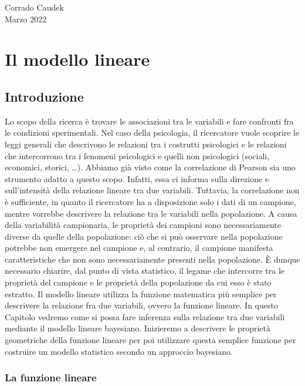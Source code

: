 \documentclass[
  11pt,
]{krantz}
\theoremstyle{definition}
\theoremstyle{definition}
\theoremstyle{definition}
\theoremstyle{definition}
\theoremstyle{remark}
\begin{document}
\begin{flushright}
Corrado Caudek\\
Marzo 2022 \end{flushright}

\mainmatter

\hypertarget{part-il-modello-lineare}{%
\part{Il modello lineare}\label{part-il-modello-lineare}}

\hypertarget{regr-models-intro}{%
\chapter{Introduzione}\label{regr-models-intro}}

Lo scopo della ricerca è trovare le associazioni tra le variabili e fare confronti fra le condizioni sperimentali. Nel caso della psicologia, il ricercatore vuole scoprire le leggi generali che descrivono le relazioni tra i costrutti psicologici e le relazioni che intercorrono tra i fenomeni psicologici e quelli non psicologici (sociali, economici, storici, \ldots). Abbiamo già visto come la correlazione di Pearson sia uno strumento adatto a questo scopo. Infatti, essa ci informa sulla direzione e sull'intensità della relazione lineare tra due variabili. Tuttavia, la correlazione non è sufficiente, in quanto il ricercatore ha a disposizione solo i dati di un campione, mentre vorrebbe descrivere la relazione tra le variabili nella popolazione. A causa della variabilità campionaria, le proprietà dei campioni sono necessariamente diverse da quelle della popolazione: ciò che si può osservare nella popolazione potrebbe non emergere nel campione e, al contrario, il campione manifesta caratteristiche che non sono necessariamente presenti nella popolazione. È dunque necessario chiarire, dal punto di vista statistico, il legame che intercorre tra le proprietà del campione e le proprietà della popolazione da cui esso è stato estratto. Il modello lineare utilizza la funzione matematica più semplice per descrivere la relazione fra due variabili, ovvero la funzione lineare. In questo Capitolo vedremo come si possa fare inferenza sulla relazione tra due variabili mediante il modello lineare bayesiano. Inizieremo a descrivere le proprietà geometriche della funzione lineare per poi utilizzare questa semplice funzione per costruire un modello statistico secondo un approccio bayesiano.

\hypertarget{la-funzione-lineare}{%
\section{La funzione lineare}\label{la-funzione-lineare}}
\end{document}
